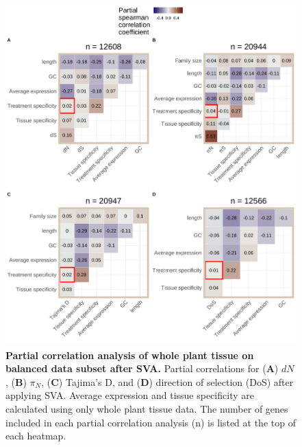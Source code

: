 \documentclass[12pt]{article}
\begin{document}
\begin{figure}[H]
\centering
\includegraphics[width = \linewidth]{figures/appendix_a/partialCorrelations_fullyBalancedSubset_wholePlant_2023-02-22.pdf}
\caption{\textbf{Partial correlation analysis of whole plant tissue on balanced data subset after SVA.} Partial correlations for (\textbf{A}) $dN$, (\textbf{B}) $\pi_N$, (\textbf{C}) Tajima's D, and (\textbf{D}) direction of selection (DoS) after applying SVA. Average expression and tissue specificity are calculated using only whole plant tissue data. The number of genes included in each partial correlation analysis (n) is listed at the top of each heatmap.}%
\end{figure}
\end{document}
